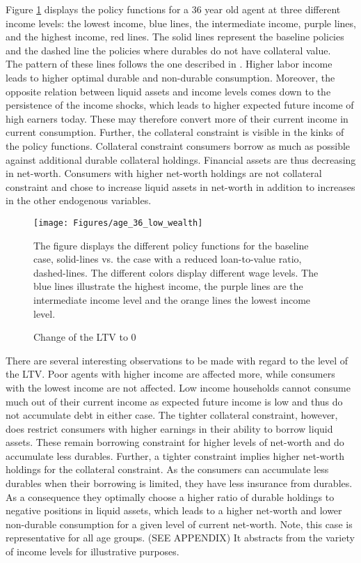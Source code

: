 \documentclass[a4paper,12pt,legno]{article}
\begin{document}
Figure \ref{policy_downpayment0_age36} displays the policy functions for a 36 year old agent at three different income levels: the lowest income, blue lines, the intermediate income, purple lines, and the highest income, red lines. The solid lines represent the baseline policies and the dashed line the policies where durables do not have collateral value.\\ 
The pattern of these lines follows the one described in \cite{hintermaier2010}. Higher labor income leads to higher optimal durable and non-durable consumption. Moreover, the opposite relation between liquid assets and income levels comes down to the persistence of the income shocks, which leads to higher expected future income of high earners today. These may therefore convert more of their current income in current consumption. Further, the collateral constraint is visible in the kinks of the policy functions. Collateral constraint consumers borrow as much as possible against additional durable collateral holdings. Financial assets are thus decreasing in net-worth. Consumers with higher net-worth holdings are not collateral constraint and chose to increase liquid assets in net-worth in addition to increases in the other endogenous variables.
\begin{figure}[!htbp]
\caption{Change of the LTV to $0$} 
\label{policy_downpayment0_age36}	%
\centering
\texttt{[image: Figures/age\_36\_low\_wealth]}  %

\begin{minipage}{0.8\linewidth}
\footnotesize{The figure displays the different policy functions for the baseline case, solid-lines vs. the case with a reduced loan-to-value ratio, dashed-lines. The different colors display different wage levels. The blue lines illustrate the highest income, the purple lines are the intermediate income level and the orange lines the lowest income level.}
\end{minipage}

\end{figure}
There are several interesting observations to be made with regard to the level of the LTV. Poor agents with higher income are affected more, while consumers with the lowest income are not affected.
Low income households cannot consume much out of their current income as expected future income is low and thus do not accumulate debt in either case. The tighter collateral constraint, however, does restrict consumers with higher earnings in their ability to borrow liquid assets. These remain borrowing constraint for higher levels of net-worth and do accumulate less durables. Further, a tighter constraint implies higher net-worth holdings for the collateral constraint. As the consumers can accumulate less durables when their borrowing is limited, they have less insurance from durables. As a consequence they optimally choose a higher ratio of durable holdings to negative positions in liquid assets, which leads to a higher net-worth and lower non-durable consumption for a given level of current net-worth.
Note, this case is representative for all age groups. (SEE APPENDIX) It abstracts from the variety of income levels for illustrative purposes.
\end{document}
